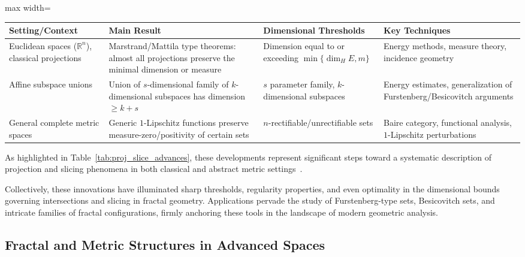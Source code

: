\documentclass[sigconf]{acmart}
\begin{document}
\begin{table*}[htbp]
\centering
\caption{Recent Advances in Projection and Slicing Theorems}
\label{tab:proj_slice_advances}
\begin{adjustbox}{max width=\textwidth}
\begin{tabular}{llll}
\toprule
\textbf{Setting/Context} & \textbf{Main Result} & \textbf{Dimensional Thresholds} & \textbf{Key Techniques} \\
\midrule
Euclidean spaces ($\mathbb{R}^n$), classical projections & Marstrand/Mattila type theorems: almost all projections preserve the minimal dimension or measure & Dimension equal to or exceeding $\min\{\dim_H E, m\}$ & Energy methods, measure theory, incidence geometry \\
Affine subspace unions & Union of $s$-dimensional family of $k$-dimensional subspaces has dimension $\geq k+s$ & $s$ parameter family, $k$-dimensional subspaces & Energy estimates, generalization of Furstenberg/Besicovitch arguments \\
General complete metric spaces & Generic $1$-Lipschitz functions preserve measure-zero/positivity of certain sets & $n$-rectifiable/unrectifiable sets & Baire category, functional analysis, $1$-Lipschitz perturbations \\
\bottomrule
\end{tabular}
\end{adjustbox}
\end{table*}

As highlighted in Table~\ref{tab:proj_slice_advances}, these developments represent significant steps toward a systematic description of projection and slicing phenomena in both classical and abstract metric settings~\cite{ref74, ref21, ref75}.

Collectively, these innovations have illuminated sharp thresholds, regularity properties, and even optimality in the dimensional bounds governing intersections and slicing in fractal geometry. Applications pervade the study of Furstenberg-type sets, Besicovitch sets, and intricate families of fractal configurations, firmly anchoring these tools in the landscape of modern geometric analysis.

\subsection{Fractal and Metric Structures in Advanced Spaces}
\end{document}
